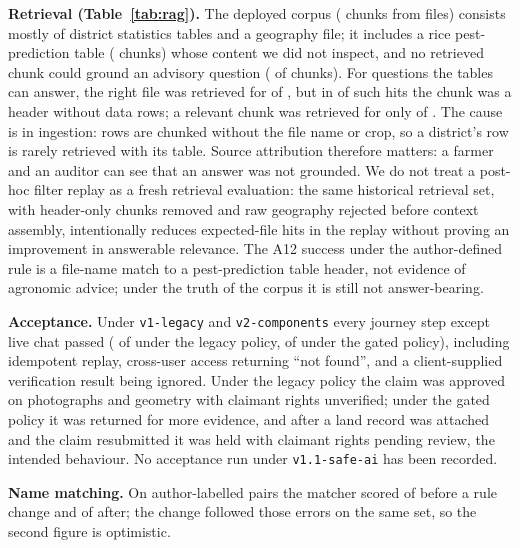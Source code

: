 \documentclass[journal]{IEEEtran}
\begin{document}
\textbf{Retrieval (Table~\ref{tab:rag}).} The deployed corpus (\RagCorpusChunks{} chunks from \RagCorpusFiles{} files) consists mostly of district statistics tables and a geography file; it includes a rice pest-prediction table (\RagPestTableChunks{} chunks) whose content we did not inspect, and no retrieved chunk could ground an advisory question (\RagAdvisoryAnswerBearing{} of \RagAdvisoryChunks{} chunks). For questions the tables can answer, the right file was retrieved for \RagAnswerableExpectedFile{} of \RagAnswerableQueries{}, but in \RagHeaderOnlyHits{} of \RagExpectedFileHits{} such hits the chunk was a header without data rows; a relevant chunk was retrieved for only \RagAnswerableRelevantHits{} of \RagAnswerableQueries{}. The cause is in ingestion: rows are chunked without the file name or crop, so a district's row is rarely retrieved with its table. Source attribution therefore matters: a farmer and an auditor can see that an answer was not grounded. We do not treat a post-hoc filter replay as a fresh retrieval evaluation: the same historical retrieval set, with header-only chunks removed and raw geography rejected before context assembly, intentionally reduces expected-file hits in the replay without proving an improvement in answerable relevance. The A12 success under the author-defined rule is a file-name match to a pest-prediction table header, not evidence of agronomic advice; under the truth of the corpus it is still not answer-bearing.

\textbf{Acceptance.} Under \texttt{v1-legacy} and \texttt{v2-components} every journey step except live chat passed (\AcceptanceLegacyPassed{} of \AcceptanceLegacyTotal{} under the legacy policy, \AcceptanceGatedPassed{} of \AcceptanceGatedTotal{} under the gated policy), including idempotent replay, cross-user access returning ``not found'', and a client-supplied verification result being ignored. Under the legacy policy the claim was approved on photographs and geometry with claimant rights unverified; under the gated policy it was returned for more evidence, and after a land record was attached and the claim resubmitted it was held with claimant rights pending review, the intended behaviour. No acceptance run under \texttt{v1.1-safe-ai} has been recorded.

\textbf{Name matching.} On \NamesPairs{} author-labelled pairs the matcher scored \NamesCorrectBeforeTuning{} of \NamesPairs{} before a rule change and \NamesCorrectAfterTuning{} of \NamesPairs{} after; the change followed those errors on the same set, so the second figure is optimistic.
\end{document}
